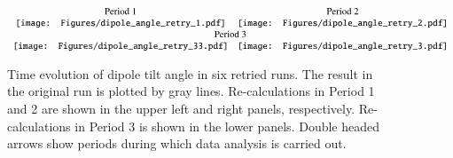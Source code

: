 \begin{figure}[ht]
\begin{center}
\[
\begin{array}{cc}
\mbox{Period 1} & \mbox{Period 2} \\
\texttt{[image: Figures/dipole\_angle\_retry\_1.pdf]} &
\texttt{[image: Figures/dipole\_angle\_retry\_2.pdf]} \\
\multicolumn{2}{c}{\mbox{Period 3}} \\
\texttt{[image: Figures/dipole\_angle\_retry\_33.pdf]} &
\texttt{[image: Figures/dipole\_angle\_retry\_3.pdf]}
\end{array}
\]
\end{center}
\caption{
Time evolution of dipole tilt angle in six retried runs. 
The result in the original run is plotted by gray lines. 
Re-calculations in Period 1 and 2 are shown in the upper left and right panels, respectively. 
Re-calculations in Period 3 is shown in the lower panels.
Double headed arrows show periods during which data analysis is carried out.
}
\label{fig:dipole_tilt_retries}
\end{figure}
